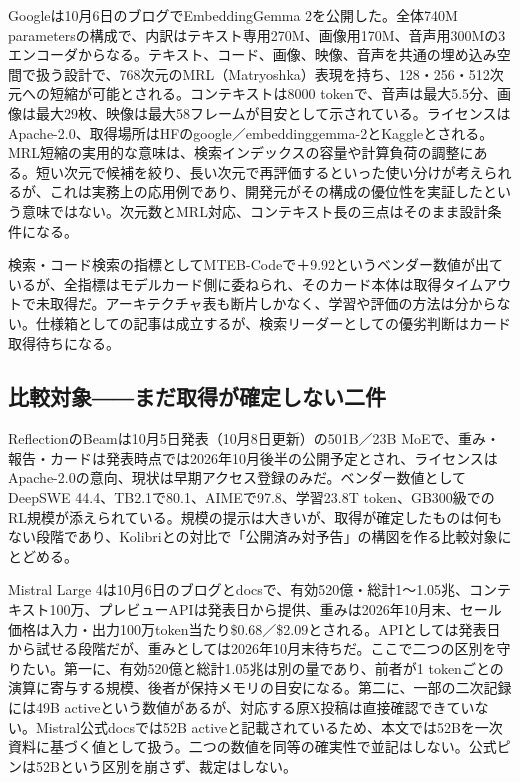 Googleは10月6日のブログでEmbeddingGemma 2を公開した。全体740M parametersの構成で、内訳はテキスト専用270M、画像用170M、音声用300Mの3エンコーダからなる。テキスト、コード、画像、映像、音声を共通の埋め込み空間で扱う設計で、768次元のMRL（Matryoshka）表現を持ち、128・256・512次元への短縮が可能とされる。コンテキストは8000 tokenで、音声は最大5.5分、画像は最大29枚、映像は最大58フレームが目安として示されている。ライセンスはApache-2.0、取得場所はHFのgoogle／embeddinggemma-2とKaggleとされる。MRL短縮の実用的な意味は、検索インデックスの容量や計算負荷の調整にある。短い次元で候補を絞り、長い次元で再評価するといった使い分けが考えられるが、これは実務上の応用例であり、開発元がその構成の優位性を実証したという意味ではない。次元数とMRL対応、コンテキスト長の三点はそのまま設計条件になる。\cite{embedgemma2}

検索・コード検索の指標としてMTEB-Codeで＋9.92というベンダー数値が出ているが、全指標はモデルカード側に委ねられ、そのカード本体は取得タイムアウトで未取得だ。アーキテクチャ表も断片しかなく、学習や評価の方法は分からない。仕様箱としての記事は成立するが、検索リーダーとしての優劣判断はカード取得待ちになる。\cite{embedgemma2}

\subsection*{比較対象――まだ取得が確定しない二件}

ReflectionのBeamは10月5日発表（10月8日更新）の501B／23B MoEで、重み・報告・カードは発表時点では2026年10月後半の公開予定とされ、ライセンスはApache-2.0の意向、現状は早期アクセス登録のみだ。ベンダー数値としてDeepSWE 44.4、TB2.1で80.1、AIMEで97.8、学習23.8T token、GB300級でのRL規模が添えられている。規模の提示は大きいが、取得が確定したものは何もない段階であり、Kolibriとの対比で「公開済み対予告」の構図を作る比較対象にとどめる。\cite{beam}

Mistral Large 4は10月6日のブログとdocsで、有効520億・総計1～1.05兆、コンテキスト100万、プレビューAPIは発表日から提供、重みは2026年10月末、セール価格は入力・出力100万token当たり\$0.68／\$2.09とされる。APIとしては発表日から試せる段階だが、重みとしては2026年10月末待ちだ。ここで二つの区別を守りたい。第一に、有効520億と総計1.05兆は別の量であり、前者が1 tokenごとの演算に寄与する規模、後者が保持メモリの目安になる。第二に、一部の二次記録には49B activeという数値があるが、対応する原X投稿は直接確認できていない。Mistral公式docsでは52B activeと記載されているため、本文では52Bを一次資料に基づく値として扱う。二つの数値を同等の確実性で並記はしない。公式ピンは52Bという区別を崩さず、裁定はしない。\cite{mistral4}

